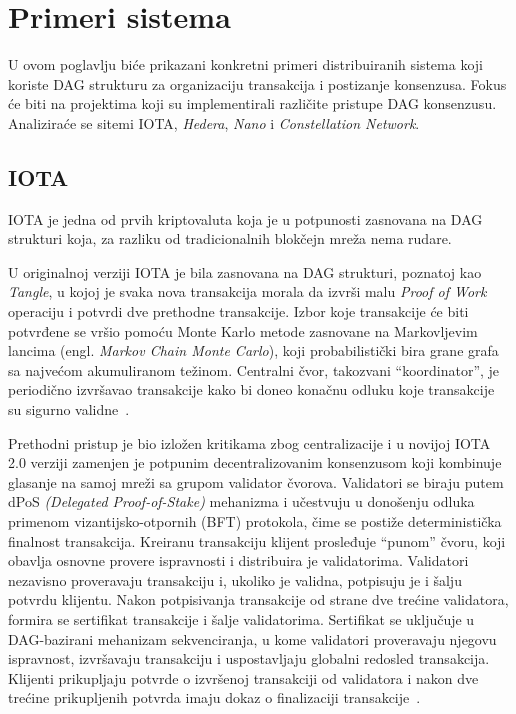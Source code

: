 \section{Primeri sistema}

U ovom poglavlju biće prikazani konkretni primeri distribuiranih sistema koji koriste DAG strukturu za organizaciju transakcija i postizanje konsenzusa. Fokus će biti na projektima koji su implementirali različite pristupe DAG konsenzusu. Analiziraće se sitemi IOTA, \textit{Hedera}, \textit{Nano} i \textit{Constellation Network}.

\subsection{IOTA}

IOTA je jedna od prvih kriptovaluta koja je u potpunosti zasnovana na DAG strukturi koja, za razliku od tradicionalnih blokčejn mreža nema rudare.

U originalnoj verziji IOTA je bila zasnovana na DAG strukturi, poznatoj kao \textit{Tangle}, u kojoj je svaka nova transakcija morala da izvrši malu \textit{Proof of Work} operaciju i potvrdi dve prethodne transakcije. Izbor koje transakcije će biti potvrđene se vršio pomoću Monte Karlo metode zasnovane na Markovljevim lancima (engl. \textit{Markov Chain Monte Carlo}), koji probabilistički bira grane grafa sa najvećom akumuliranom težinom. Centralni čvor, takozvani \enquote{koordinator}, je periodično izvršavao transakcije kako bi doneo konačnu odluku koje transakcije su sigurno validne~\cite{blockeden DAG}. 

Prethodni pristup je bio izložen kritikama zbog centralizacije i u novijoj IOTA 2.0 verziji zamenjen je potpunim decentralizovanim konsenzusom koji kombinuje glasanje na samoj mreži sa grupom validator čvorova. Validatori se biraju putem dPoS \textit{(Delegated Proof-of-Stake)} mehanizma i učestvuju u donošenju odluka primenom vizantijsko-otpornih (BFT) protokola, čime se postiže deterministička finalnost transakcija. Kreiranu transakciju klijent prosleđuje \enquote{punom} čvoru, koji obavlja osnovne provere ispravnosti i distribuira je validatorima. Validatori nezavisno proveravaju transakciju i, ukoliko je validna, potpisuju je i šalju potvrdu klijentu. Nakon potpisivanja transakcije od strane dve trećine validatora, formira se sertifikat transakcije i šalje validatorima. Sertifikat se uključuje u DAG-bazirani mehanizam sekvenciranja, u kome validatori proveravaju njegovu ispravnost, izvršavaju transakciju i uspostavljaju globalni redosled transakcija. Klijenti prikupljaju potvrde o izvršenoj transakciji od validatora i nakon dve trećine prikupljenih potvrda imaju dokaz o finalizaciji transakcije~\cite{iota docs}.

